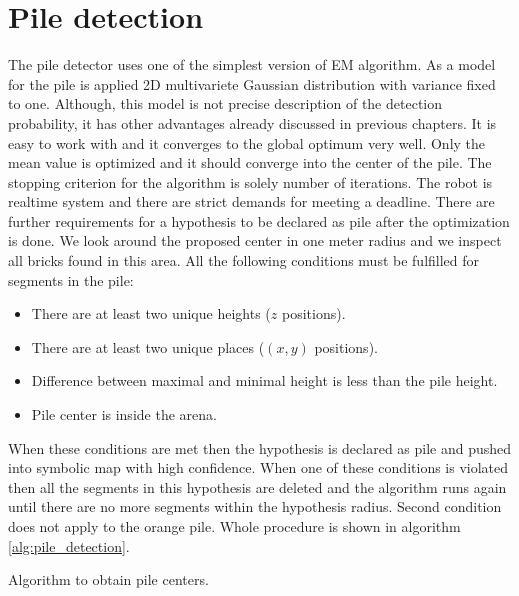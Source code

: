 \section{Pile detection}
The pile detector uses one of the simplest version of EM algorithm. As a model for the pile is applied 2D multivariete Gaussian distribution with variance fixed to one. Although, this model is not precise description of the detection probability, it has other advantages already discussed in previous chapters. It is easy to work with and it converges to the global optimum very well. Only the mean value is optimized and it should converge into the center of the pile. The stopping criterion for the algorithm is solely number of iterations. The robot is realtime system and there are strict demands for meeting a deadline. There are further requirements for a hypothesis to be declared as pile after the optimization is done. We look around the proposed center in one meter radius and we inspect all bricks found in this area. All the following conditions must be fulfilled for segments in the pile:
\begin{itemize}
\item There are at least two unique heights ($z$ positions).
\item There are at least two unique places ($(x,y)$ positions).
\item Difference between maximal and minimal height is less than the pile height.
\item Pile center is inside the arena.
\end{itemize}
When these conditions are met then the hypothesis is declared as pile and pushed into symbolic map with high confidence. When one of these conditions is violated then all the segments in this hypothesis are deleted and the algorithm runs again until there are no more segments within the hypothesis radius. Second condition does not apply to the orange pile. Whole procedure is shown in algorithm \ref{alg:pile_detection}.

\begin{algorithm}[]
 \caption{Algorithm to obtain pile centers.}
 \label{alg:pile_detection}
\end{algorithm}

